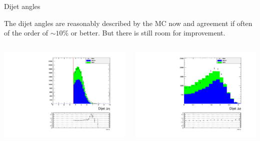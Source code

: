 \documentclass[8pt]{beamer}
\begin{document}
\begin{frame}{Dijet angles}

The dijet angles are reasonably described by the MC now and agreement if often of the order of $\sim10\%$ or better. But there is still room for improvement. 

\begin{columns}
 
\begin{block}{}
 
\includegraphics[width=\linewidth]{img/DEta3p6_MetSig3p0_MinDPhiJetsMet1p5/dijet_deta.pdf}

\end{block}

\begin{block}
 
\includegraphics[width=\linewidth]{img/DEta3p6_MetSig3p0_MinDPhiJetsMet1p5/dijet_dphi.pdf}
 
\end{block}

\end{columns}

\end{frame}
\end{document}
